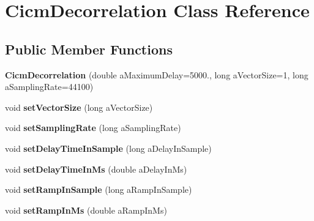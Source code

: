 \hypertarget{class_cicm_decorrelation}{\section{Cicm\-Decorrelation Class Reference}
\label{class_cicm_decorrelation}
}
\subsection*{Public Member Functions}
\begin{DoxyCompactItemize}
\item 
\hypertarget{class_cicm_decorrelation_adafae7e2fc7a93b7364bbd1b261e6951}{{\bfseries Cicm\-Decorrelation} (double a\-Maximum\-Delay=5000., long a\-Vector\-Size=1, long a\-Sampling\-Rate=44100)}\label{class_cicm_decorrelation_adafae7e2fc7a93b7364bbd1b261e6951}

\item 
\hypertarget{class_cicm_decorrelation_a507597110d367005817c5168d3e84b10}{void {\bfseries set\-Vector\-Size} (long a\-Vector\-Size)}\label{class_cicm_decorrelation_a507597110d367005817c5168d3e84b10}

\item 
\hypertarget{class_cicm_decorrelation_ababded5f3fced5329a4e898791d07a3f}{void {\bfseries set\-Sampling\-Rate} (long a\-Sampling\-Rate)}\label{class_cicm_decorrelation_ababded5f3fced5329a4e898791d07a3f}

\item 
\hypertarget{class_cicm_decorrelation_a0a6f0e743aabbf7cbf2c48003f6af98c}{void {\bfseries set\-Delay\-Time\-In\-Sample} (long a\-Delay\-In\-Sample)}\label{class_cicm_decorrelation_a0a6f0e743aabbf7cbf2c48003f6af98c}

\item 
\hypertarget{class_cicm_decorrelation_a3d031fd3db9bc382d5c8cc873ef8fa1b}{void {\bfseries set\-Delay\-Time\-In\-Ms} (double a\-Delay\-In\-Ms)}\label{class_cicm_decorrelation_a3d031fd3db9bc382d5c8cc873ef8fa1b}

\item 
\hypertarget{class_cicm_decorrelation_a21270d01be9d010718e382f425db5071}{void {\bfseries set\-Ramp\-In\-Sample} (long a\-Ramp\-In\-Sample)}\label{class_cicm_decorrelation_a21270d01be9d010718e382f425db5071}

\item 
\hypertarget{class_cicm_decorrelation_a5d3ba4a649099851d55c800f1908a5e1}{void {\bfseries set\-Ramp\-In\-Ms} (double a\-Ramp\-In\-Ms)}\label{class_cicm_decorrelation_a5d3ba4a649099851d55c800f1908a5e1}


\end{DoxyCompactItemize}
